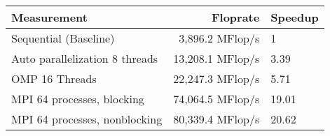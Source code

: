 \begin{center}

  \begin{tabular} {|l|r|l|}
    \hline
    Measurement & Floprate & Speedup \\ \hline
    Sequential (Baseline) & 3,896.2 MFlop/s & 1 \\ \hline
    Auto parallelization 8 threads & 13,208.1 MFlop/s & 3.39 \\ \hline
    OMP 16 Threads  & 22,247.3 MFlop/s & 5.71\\ \hline
    MPI 64 processes, blocking  & 74,064.5 MFlop/s & 19.01\\ \hline
    MPI 64 processes, nonblocking  & 80,339.4 MFlop/s & 20.62\\ \hline
    

    

    
  \end{tabular}

\end{center}
